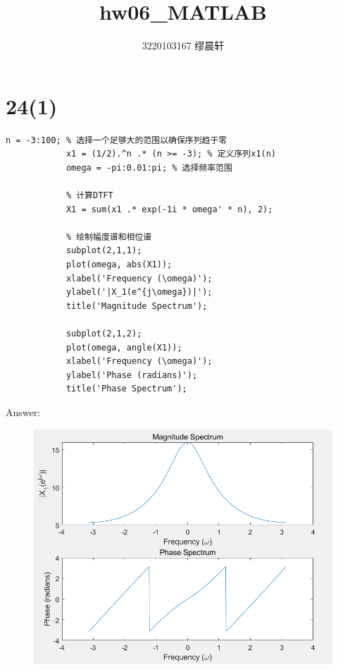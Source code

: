 \documentclass{article}
\title{hw06\_MATLAB}
\author{3220103167 缪晨轩}
\date{\zhdate{2024/4/9}}
\begin{document}
    \maketitle
    \section*{24(1)}
        \begin{lstlisting}[caption={题24(1) MATLAB代码}, label={lst:matlab}]
            n = -3:100; % 选择一个足够大的范围以确保序列趋于零
            x1 = (1/2).^n .* (n >= -3); % 定义序列x1(n)
            omega = -pi:0.01:pi; % 选择频率范围

            % 计算DTFT
            X1 = sum(x1 .* exp(-1i * omega' * n), 2);

            % 绘制幅度谱和相位谱
            subplot(2,1,1);
            plot(omega, abs(X1));
            xlabel('Frequency (\omega)');
            ylabel('|X_1(e^{j\omega})|');
            title('Magnitude Spectrum');

            subplot(2,1,2);
            plot(omega, angle(X1));
            xlabel('Frequency (\omega)');
            ylabel('Phase (radians)');
            title('Phase Spectrum');

        \end{lstlisting}
        Answer: 
            \begin{figure}[h]
                \includegraphics{24_1.png}
            \end{figure}
            \FloatBarrier
\end{document}
